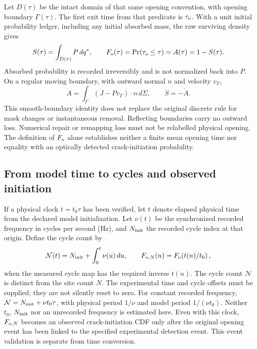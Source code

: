 \documentclass[11pt]{article}
\begin{document}
Let $D(\tau)$ be the intact domain of that same opening convention, with
opening boundary $\Gamma(\tau)$. The first exit time from that predicate is
$\tau_{\rm o}$. With a unit initial probability ledger, including any initial
absorbed mass, the raw surviving density gives
\begin{equation}
 S(\tau)=\int_{D(\tau)}P\,dq^*,\qquad
 F_{\rm o}(\tau)=\Pr(\tau_{\rm o}\leq\tau)=A(\tau)=1-S(\tau).
\end{equation}
Absorbed probability is recorded irreversibly and is not normalized back into $P$.
On a regular moving boundary, with outward normal $n$ and velocity $v_\Gamma$,
\begin{equation}
 \dot A=\int_\Gamma (J-Pv_\Gamma)\cdot n\,d\Sigma,\qquad \dot S=-\dot A.
\end{equation}
This smooth-boundary identity does not replace the original discrete rule for
mask changes or instantaneous removal. Reflecting boundaries carry no outward
loss. Numerical repair or remapping loss must not be relabelled physical opening.
The definition of $F_{\rm o}$ alone establishes neither a finite mean opening
time nor equality with an optically detected crack-initiation probability.

\subsection{From model time to cycles and observed initiation}
If a physical clock $t=t_0\tau$ has been verified, let $t$ denote elapsed
physical time from the declared model initialization. Let $\nu(t)$ be the
synchronized recorded frequency in cycles per second (Hz), and $N_{\rm init}$
the recorded cycle index at that origin. Define the cycle count by
\begin{equation}
 \mathcal N(t)=N_{\rm init}+\int_0^t\nu(u)\,du,\qquad
 F_{{\rm o},N}(n)=F_{\rm o}\!\left(t(n)/t_0\right),
\end{equation}
when the measured cycle map has the required inverse $t(n)$.
The cycle count $\mathcal N$ is distinct from the site count $N$.
The experimental time and cycle offsets must be supplied; they are not
silently reset to zero. For constant recorded frequency,
$\mathcal N=N_{\rm init}+\nu t_0\tau$, with physical period $1/\nu$
and model period $1/(\nu t_0)$. Neither $t_0$, $N_{\rm init}$ nor an
unrecorded frequency is estimated here.
Even with this clock, $F_{{\rm o},N}$ becomes an observed crack-initiation CDF
only after the original opening event has been linked to the specified
experimental detection event. This event validation is separate from time conversion.
\end{document}
